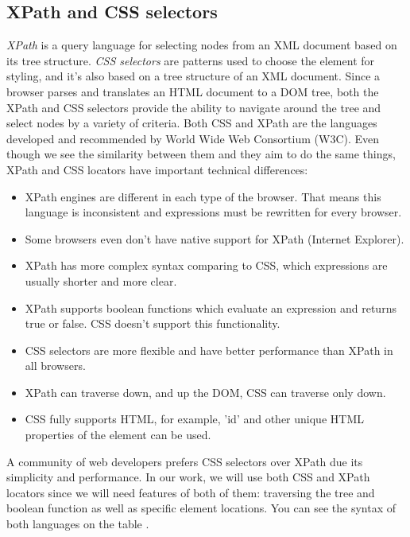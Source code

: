 \subsection{XPath and CSS selectors}
\label{subsec:xpathcss}

\textit{XPath} is a query language for selecting nodes from an XML document based on its tree structure. \textit{CSS selectors} are patterns used to choose the element for styling, and it's also based on a tree structure of an XML document. Since a browser parses and translates an HTML document to a DOM tree, both the XPath and CSS selectors provide the ability to navigate around the tree and select nodes by a variety of criteria. Both CSS and XPath are the languages developed and recommended by World Wide Web Consortium (W3C). Even though we see the similarity between them and they aim to do the same things, XPath and CSS locators have important technical differences:
\begin{itemize}
    \item XPath engines are different in each type of the browser. That means this language is inconsistent and expressions must be rewritten for every browser.  
    \item Some browsers even don't have native support for XPath (Internet Explorer).
    \item XPath has more complex syntax comparing to CSS, which expressions are usually shorter and more clear.
    \item XPath supports boolean functions which evaluate an expression and returns true or false. CSS doesn't support this functionality.
    \item CSS selectors are more flexible and have better performance than XPath in all browsers.
    \item XPath can traverse down, and up the DOM, CSS can traverse only down.
    \item CSS fully supports HTML, for example, 'id' and other unique HTML properties of the element can be used.
\end{itemize}

A community of web developers prefers CSS selectors over XPath due its simplicity and performance. In our work, we will use both CSS and XPath locators since we will need features of both of them: traversing the tree and boolean function as well as specific element locations. You can see the syntax of both languages on the table .\\

